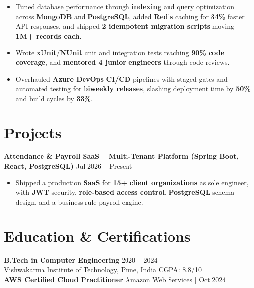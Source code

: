 \documentclass[a4paper,10pt]{article}
\begin{document}
\begin{itemize}[leftmargin=*]
    \item Tuned database performance through \textbf{indexing} and query optimization across \textbf{MongoDB} and \textbf{PostgreSQL}, added \textbf{Redis} caching for \textbf{34\%} faster API responses, and shipped \textbf{2 idempotent migration scripts} moving \textbf{1M+ records each}.
    \item Wrote \textbf{xUnit}/\textbf{NUnit} unit and integration tests reaching \textbf{90\% code coverage}, and \textbf{mentored 4 junior engineers} through code reviews.
    \item Overhauled \textbf{Azure DevOps} \textbf{CI/CD} pipelines with staged gates and automated testing for \textbf{biweekly releases}, slashing deployment time by \textbf{50\%} and build cycles by \textbf{33\%}.
\end{itemize}

\section*{Projects}

\textbf{Attendance \& Payroll SaaS -- Multi-Tenant Platform (Spring Boot, React, PostgreSQL)} \hfill Jul 2026 -- Present
\begin{itemize}[leftmargin=*]
    \item Shipped a production \textbf{SaaS} for \textbf{15+ client organizations} as sole engineer, with \textbf{JWT} security, \textbf{role-based access control}, \textbf{PostgreSQL} schema design, and a business-rule payroll engine.
\end{itemize}

\section*{Education \& Certifications}
\textbf{B.Tech in Computer Engineering} \hfill 2020 -- 2024 \\
Vishwakarma Institute of Technology, Pune, India \hfill CGPA: 8.8/10 \\
\textbf{AWS Certified Cloud Practitioner} \hfill Amazon Web Services \;|\; Oct 2024
\end{document}
